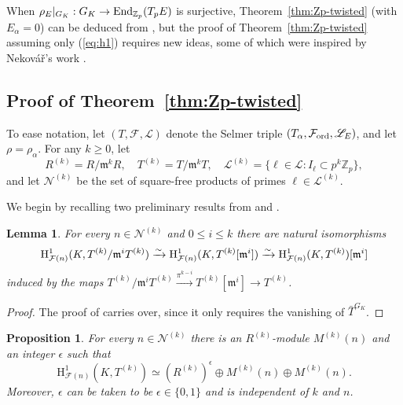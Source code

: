 \documentclass[10pt]{amsart}
\numberwithin{equation}{section}
\newtheorem{lemma}[theorem]{Lemma}
\newtheorem{prop}[theorem]{Proposition}
\theoremstyle{definition}
\theoremstyle{remark}
\newcommand{\Z}{\mathbb{Z}}
\newcommand{\cL}{\mathscr{L}}
\newcommand{\cN}{\mathscr{N}}
\newcommand{\Fcal}{\mathcal{F}}
\newcommand{\rH}{\mathrm{H}}
\newcommand{\fm}{\mathfrak{m}}
\newcommand{\CF}{\mathcal{F}}
\begin{document}
When $\rho_E\vert_{G_K}:G_K\rightarrow{\rm End}_{\Z_p}(T_pE)$ is surjective, Theorem~\ref{thm:Zp-twisted} (with $E_\alpha=0$) can be deduced from \cite[Thm.~1.6.1]{howard}, but the proof of Theorem~\ref{thm:Zp-twisted} assuming only (\ref{eq:h1}) requires new ideas, some of which were inspired by Nekov\'{a}\v{r}'s work \cite{nekovar}.



\subsection{Proof of Theorem~\ref{thm:Zp-twisted}}

To ease notation, let $(T,\mathcal{F},\cL)$ denote the Selmer triple $(T_\alpha,\Fcal_{\rm ord},\cL_E)$, and let $\rho=\rho_\alpha$. For any $k\geqslant 0$, let 
\[
R^{(k)}=R/\fm^kR,\quad T^{(k)}=T/\fm^kT,\quad\cL^{(k)}=\{\ell\in\cL\colon I_\ell\subset p^k\Z_p\},
\]
and let $\mathscr{N}^{(k)}$ be the set of square-free products of primes $\ell\in\cL^{(k)}$. 

We begin by recalling two preliminary results from \cite{mazrub} and \cite{howard}.

\begin{lemma}\label{lemmamod} 
For every $n\in\cN^{(k)}$ and $0\leqslant i\leqslant k$ there are natural isomorphisms
\begin{equation}\label{eq2}
\rH^1_{\Fcal(n)}(K,T^{(k)}/\fm^iT^{(k)})\xrightarrow{\sim}\rH^1_{\Fcal(n)}(K,T^{(k)}[\fm^i])\xrightarrow{\sim}{\rm H}_{\Fcal(n)}^1(K,T^{(k)})[\fm^i]\nonumber
\end{equation}
induced by the maps $T^{(k)}/\fm^iT^{(k)}\xrightarrow{\pi^{k-i}}T^{(k)}[\fm^i]\rightarrow T^{(k)}$.
\end{lemma}
\begin{proof}
The proof of \cite[Lem.~3.5.4]{mazrub} carries over, since it only requires the vanishing of $\bar{T}^{G_K}$.
\end{proof}

\begin{prop}\label{propstructure}
For every $n\in\cN^{(k)}$ there is an $R^{(k)}$-module $M^{(k)}(n)$  and an integer $\epsilon$ such that
\begin{equation}\label{eq1}
\rH^1_{\CF(n)}(K,T^{(k)}) \simeq (R^{(k)})^\epsilon\oplus M^{(k)}(n)\oplus M^{(k)}(n).\nonumber
\end{equation}
Moreover, $\epsilon$ can be taken to be $\epsilon\in\{0,1\}$ and is independent of $k$ and $n$.
\end{prop}
\end{document}

